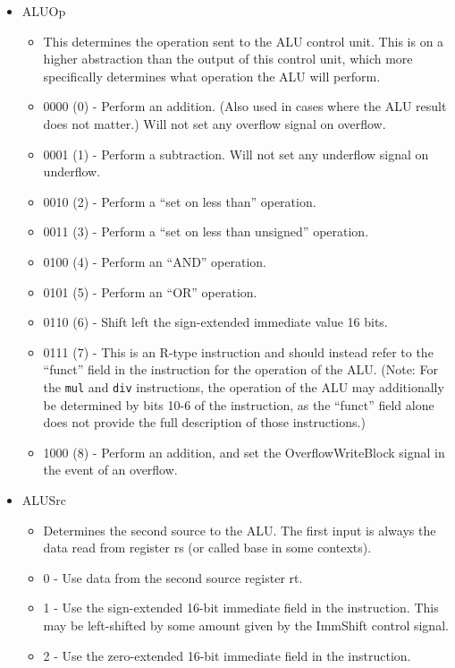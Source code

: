 \documentclass[
    paper=letter,
    parskip=half,
    fontsize=12pt,
    titlepage=firstiscover,
    toc=bibliography,
    numbers=endperiod
]{scrartcl}
\providecommand{\tightlist}{%
  \setlength{\itemsep}{0pt}\setlength{\parskip}{0pt}}
\begin{document}
\begin{itemize}
    \item ALUOp
          \begin{itemize}
              \tightlist
              \item This determines the operation sent to the ALU control unit. This is on a
                    higher abstraction than the output of this control unit, which more
                    specifically determines what operation the ALU will perform.
              \item 0000 (0) - Perform an addition. (Also used in cases where the ALU result does not matter.) Will not set any overflow signal on overflow.
              \item 0001 (1) - Perform a subtraction. Will not set any underflow signal on underflow.
              \item 0010 (2) - Perform a ``set on less than'' operation.
              \item 0011 (3) - Perform a ``set on less than unsigned'' operation.
              \item 0100 (4) - Perform an ``AND'' operation.
              \item 0101 (5) - Perform an ``OR'' operation.
              \item 0110 (6) - Shift left the sign-extended immediate value 16 bits.
              \item 0111 (7) - This is an R-type instruction and should instead
                    refer to the ``funct'' field in the instruction for the
                    operation of the ALU. (Note: For the \texttt{mul} and
                    \texttt{div} instructions, the operation of the ALU may
                    additionally be determined by bits 10-6 of the instruction, as
                    the ``funct'' field alone does not provide the full description
                    of those instructions.)
              \item 1000 (8) - Perform an addition, and set the OverflowWriteBlock signal in the event of an overflow.
          \end{itemize}

    \item ALUSrc
          \begin{itemize}
              \tightlist
              \item Determines the second source to the ALU. The first input is always the
                    data read from register rs (or called base in some contexts).
              \item 0 - Use data from the second source register rt.
              \item 1 - Use the sign-extended 16-bit immediate field in the instruction.
                    This may be left-shifted by some amount given by the ImmShift control signal.
              \item 2 - Use the zero-extended 16-bit immediate field in the instruction.
          \end{itemize}


\end{itemize}
\end{document}

